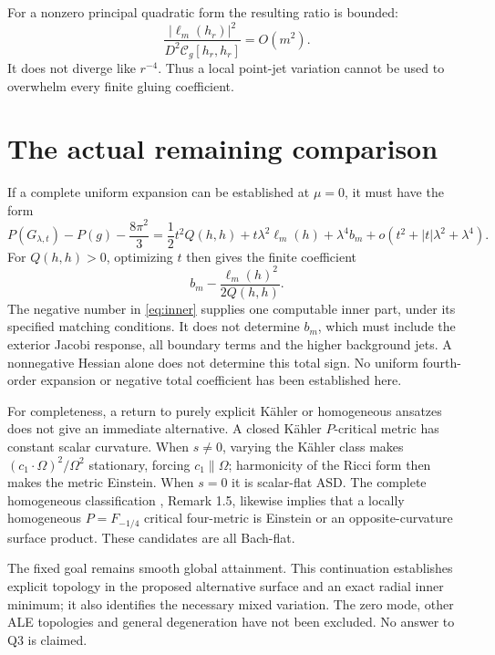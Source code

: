 \documentclass[11pt]{article}
\newcommand{\calC}{\mathcal C}
\begin{document}
For a nonzero principal quadratic form the resulting ratio is bounded:
\[
 \frac{|\ell_m(h_r)|^2}{D^2\calC_g[h_r,h_r]}=O(m^2).
\]
It does not diverge like $r^{-4}$. Thus a local point-jet variation
cannot be used to overwhelm every finite gluing coefficient.

\section{The actual remaining comparison}
If a complete uniform expansion can be established at $\mu=0$,
it must have the form
\[
 P(G_{\lambda,t})-P(g)-\frac{8\pi^2}{3}
 =\frac12t^2Q(h,h)+t\lambda^2\ell_m(h)+\lambda^4b_m
           +o(t^2+|t|\lambda^2+\lambda^4).
\]
For $Q(h,h)>0$, optimizing $t$ then gives the finite coefficient
\[
 b_m-\frac{\ell_m(h)^2}{2Q(h,h)}.
\]
The negative number in \eqref{eq:inner} supplies one computable inner
part, under its specified matching conditions. It does not determine
$b_m$, which must include the exterior Jacobi response, all boundary
terms and the higher background jets. A nonnegative Hessian alone does
not determine this total sign. No uniform fourth-order expansion or
negative total coefficient has been established here.

For completeness, a return to purely explicit K\"ahler or homogeneous
ansatzes does not give an immediate alternative. A closed K\"ahler
$P$-critical metric has constant scalar curvature. When $s\ne0$, varying
the K\"ahler class makes $(c_1\cdot\Omega)^2/\Omega^2$ stationary,
forcing $c_1\parallel\Omega$; harmonicity of the Ricci form then makes
the metric Einstein. When $s=0$ it is scalar-flat ASD. The complete
homogeneous classification \cite{BCGV}, Remark 1.5, likewise implies
that a locally homogeneous $P=F_{-1/4}$ critical four-metric is Einstein
or an opposite-curvature surface product. These candidates are all
Bach-flat.

The fixed goal remains smooth global attainment. This continuation
establishes explicit topology in the proposed alternative surface and
an exact radial inner minimum; it also identifies the necessary mixed
variation. The zero mode, other ALE topologies and general degeneration
have not been excluded. No answer to Q3 is claimed.
\end{document}
